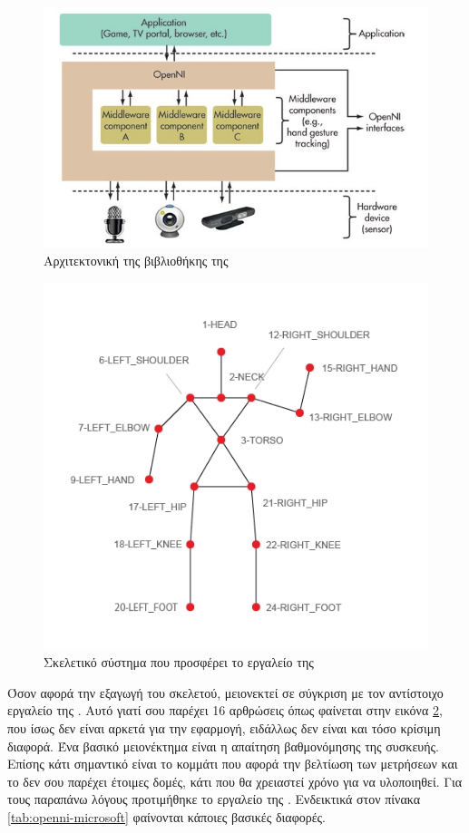\begin{figure}[H]
    \centering
    \includegraphics[width=.7\textwidth, height=.3\textheight]{kinect/fig/openni-framework.jpg}
    \caption{Αρχιτεκτονική της βιβλιοθήκης της \protect\footnotemark}
    \label{fig:openni-framework}
\end{figure}

\begin{figure}[H]
    \centering
    \includegraphics[width=.5\textwidth]{kinect/fig/openni-skeleton.png}
    \caption{Σκελετικό σύστημα που προσφέρει το εργαλείο της }
    \label{fig:openni-skeleton}
\end{figure}

Όσον αφορά την εξαγωγή του σκελετού, μειονεκτεί σε σύγκριση με τον αντίστοιχο εργαλείο της . Αυτό γιατί σου παρέχει 16 αρθρώσεις όπως φαίνεται στην εικόνα \ref{fig:openni-skeleton}, που ίσως δεν είναι αρκετά για την εφαρμογή, ειδάλλως δεν είναι και τόσο κρίσιμη διαφορά. Ένα βασικό μειονέκτημα είναι η απαίτηση βαθμονόμησης της συσκευής. Επίσης κάτι σημαντικό είναι το κομμάτι που αφορά την βελτίωση των μετρήσεων και το  δεν σου παρέχει έτοιμες δομές, κάτι που θα χρειαστεί χρόνο για να υλοποιηθεί. Για τους παραπάνω λόγους προτιμήθηκε το εργαλείο της . Ενδεικτικά στον πίνακα \ref{tab:openni-microsoft} φαίνονται κάποιες βασικές διαφορές.

